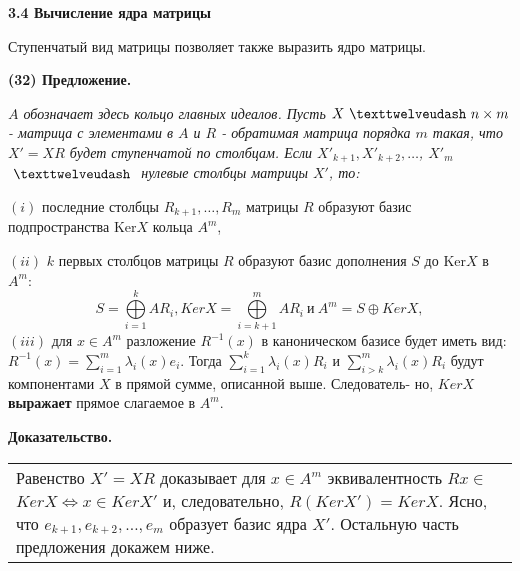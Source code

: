 	\pagebreak
	
	
	\noindent
	{\large {\bf 3.4 Вычисление ядра матрицы}}
	
	\noindent
	Ступенчатый вид матрицы позволяет также выразить ядро матрицы.
	
	\noindent
	{\bf (32) Предложение.}
	
	{\it $A$ обозначает здесь кольцо главных идеалов. Пусть $X \ \texttwelveudash \  n\times m$-\linebreak
	матрица с элементами в $A$ и $R$ - обратимая матрица порядка $m$ такая,\linebreak
	что $X' = XR$ будет ступенчатой по столбцам. Если $X'_{k + 1}, X'_{k + 2}, \ldots$,\linebreak
	$X'_{m}$ $\ \texttwelveudash \ $ нулевые столбцы матрицы $X'$, то:
	
	$(i)$ последние столбцы $R_{k + 1}, \ldots, R_{m}$ матрицы $R$ образуют базис\linebreak
	подпространства Ker$X$ кольца $A^m$,
	
	$(ii)$ $k$ первых столбцов матрицы $R$ образуют базис дополнения $S$ до\linebreak
	Ker$X$ в $A^m$:
	$$S = \bigoplus\limits_{i = 1}^k AR_i, KerX = \bigoplus\limits_{i = k + 1}^m AR_i \ \text{и} \ A^m = S \oplus KerX,$$
	$(iii)$ для $x \in A^m$ разложение $R^{-1}(x)$ в каноническом базисе будет\linebreak
	иметь вид: $R^{-1}(x) = \sum_{i = 1}^m \lambda_i (x)e_i$. Тогда $\sum_{i = 1}^k \lambda_i (x)R_i$ и $\sum_{i > k}^m \lambda_i (x)R_i$\linebreak
	будут компонентами $X$ в прямой сумме, описанной выше. Следователь-\linebreak
	но, $KerX$ {\bf выражает} прямое слагаемое в $A^m$.}
	
	\noindent
	{\bf Доказательство.}
	
	\begin{tabular}{|p{12.5cm}}
	Равенство $X' = XR$ доказывает для $x\in A^m$ эквивалентность $Rx\in$\linebreak
	$KerX \Longleftrightarrow x\in KerX'$ и, следовательно, $R(KerX') = KerX$. Ясно,\linebreak
	что $e_{k + 1}, e_{k + 2}, \ldots, e_{m}$ образует базис ядра $X'$. Остальную часть\linebreak
	предложения докажем ниже.
	\end{tabular}


